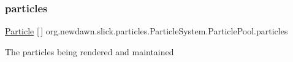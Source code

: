 \subsubsection{\texorpdfstring{particles}{particles}}
{\footnotesize\ttfamily \mbox{\hyperlink{classorg_1_1newdawn_1_1slick_1_1particles_1_1_particle}{Particle}} \mbox{[}$\,$\mbox{]} org.\+newdawn.\+slick.\+particles.\+Particle\+System.\+Particle\+Pool.\+particles}

The particles being rendered and maintained 
